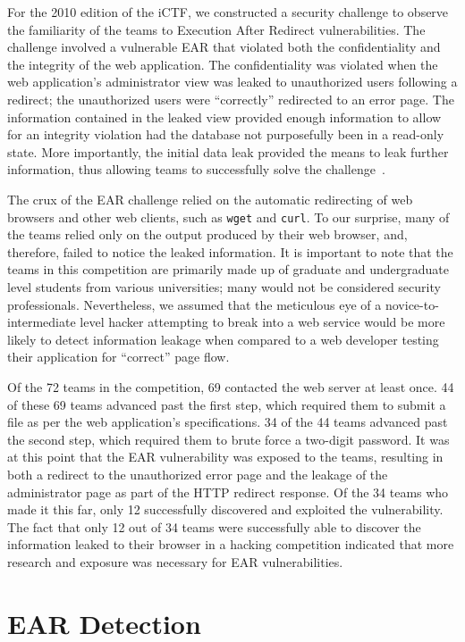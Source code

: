 For the 2010 edition of the iCTF, we constructed a security challenge to
observe the familiarity of the teams to Execution After Redirect
vulnerabilities. The challenge involved a vulnerable EAR that violated both
the confidentiality and the integrity of the web application. The
confidentiality was violated when the web application's administrator view
was leaked to unauthorized users following a redirect; the unauthorized
users were ``correctly'' redirected to an error page. The information
contained in the leaked view provided enough information to allow for an
integrity violation had the database not purposefully been in a read-only
state. More importantly, the initial data leak provided the means to leak
further information, thus allowing teams to successfully solve the
challenge~\cite{boe11:earchallenge}.

The crux of the EAR challenge relied on the automatic redirecting of web
browsers and other web clients, such as \texttt{wget} and \texttt{curl}. To
our surprise, many of the teams relied only on the output produced by their
web browser, and, therefore, failed to notice the leaked information. It is
important to note that the teams in this competition are primarily made up
of graduate and undergraduate level students from various universities;
many would not be considered security professionals. Nevertheless, we
assumed that the meticulous eye of a novice-to-intermediate level hacker
attempting to break into a web service would be more likely to detect
information leakage when compared to a web developer testing their
application for ``correct'' page flow.

Of the 72 teams in the competition, 69 contacted the web server at least
once. 44 of these 69 teams advanced past the first step, which required
them to submit a file as per the web application's specifications. 34 of
the 44 teams advanced past the second step, which required them to brute
force a two-digit password. It was at this point that the EAR vulnerability
was exposed to the teams, resulting in both a redirect to the unauthorized
error page and the leakage of the administrator page as part of the HTTP
redirect response. Of the 34 teams who made it this far, only 12
successfully discovered and exploited the vulnerability. The fact that only
12 out of 34 teams were successfully able to discover the information
leaked to their browser in a hacking competition indicated that more
research and exposure was necessary for EAR vulnerabilities.

\section{EAR Detection}

